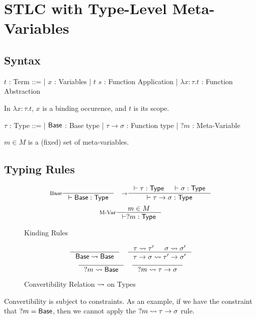 \section{STLC with Type-Level Meta-Variables}
\subsection{Syntax}
\begin{bnf}
$t$ : \textsf{Term} ::=
| $x$ : Variables
| $t$ $s$ : Function Application
| $\lambda x \colon \tau. t$ : Function Abstraction
\end{bnf}

\hfill\break
In $\lambda x \colon \tau. t$, $x$ is a binding occurence, and $t$ is its scope.

\noindent
\begin{bnf}
$\tau$ : \textsf{Type} ::=
| $\mathsf{Base}$ : Base type
| $\tau \to \sigma$ : Function type
| $?m$ : Meta-Variable
\end{bnf}

\hfill\break
$m \in M$ is a (fixed) set of meta-variables.

\subsection{Typing Rules}
\begin{figure*}[h]
   \[
    \inference[Base]{}
                    {\vdash \Base : \Type}
    \quad
    \inference[$\to$]{\vdash \tau : \Type & \vdash \sigma : \Type}
                     {\vdash \tau \to \sigma : \Type}
  \]
   \[
    \inference[M-Var]{m \in M}
                     {\vdash ?m : \Type}
  \]

  \caption*{Kinding Rules}
  \label{fig:type-mvar-stlc-kinding}
\end{figure*}

\begin{figure*}[h]
   \[
    \inference[]{}
                {\Conv{\Base}{\Base}}
    \quad
    \inference[]{\Conv{\tau}{\tau'} & \Conv{\sigma}{\sigma'}}
                {\Conv{\tau \to \sigma}{\tau' \to \sigma'}}
  \]
   \[
    \inference[]{}
                {\Conv{?m}{\Base}}
    \quad
    \inference[]{}
                {\Conv{?m}{\tau \to \sigma}}
  \]

  \caption*{Convertibility Relation $\leadsto$ on Types}
  \label{fig:type-mvar-stlc-conv}
\end{figure*}

Convertibility is subject to constraints. As an example, if we have the constraint that $?m = \mathsf{Base}$, then we cannot apply the $?m \leadsto \tau \to \sigma$ rule.

